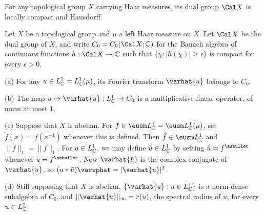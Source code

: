  For any topological group $X$ carrying Haar
measures, its dual group $\Cal X$ is locally compact and Hausdorff.


 Let $X$ be a topological group and $\mu$ a
left Haar measure on $X$.   Let $\Cal X$ be the dual group of $X$, and
write $C_0=C_0(\Cal X;\Bbb C)$ for the Banach algebra of continuous
functions $h:\Cal X\to\Bbb C$ such that $\{\chi:|h(\chi)|\ge\epsilon\}$
is compact for every $\epsilon>0$.

(a) For any $u\in L_{\Bbb C}^1=L_{\Bbb C}^1(\mu)$, its Fourier transform
$\varhat{u}$ belongs to $C_0$.

(b) The map $u\mapsto\varhat{u}:L_{\Bbb C}^1\to C_0$ is a multiplicative
linear
operator, of norm at most $1$.

(c) Suppose that $X$ is abelian.   For
$f\in\eusm L_{\Bbb C}^1=\eusm L_{\Bbb C}^1(\mu)$,
set $\tilde f(x)=\overline{f(x^{-1})}$ whenever this is defined.   Then
$\tilde f\in\eusm L_{\Bbb C}^1$ and $\|\tilde f\|_1=\|f\|_1$.   For
$u\in L_{\Bbb C}^1$,
we may define $\tilde u\in L_{\Bbb C}^1$ by setting $\tilde u=\tilde
f^{\ssbullet}$ whenever $u=f^{\ssbullet}$.   Now $\varhat{\tilde u}$ is
the complex conjugate of $\varhat{u}$, so 
$(u*\tilde u)\varsphat=|\varhat{u}|^2$.

(d) Still supposing that $X$ is abelian,
$\{\varhat{u}:u\in L_{\Bbb C}^1\}$ is a
norm-dense subalgebra of $C_0$, and $\|\varhat{u}\|_{\infty}=r(u)$, the
spectral radius of $u$, for every $u\in L_{\Bbb C}^1$.

